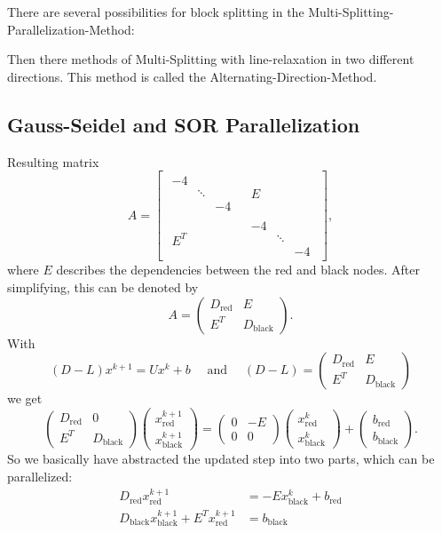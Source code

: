 There are several possibilities for block splitting in the Multi-Splitting-Parallelization-Method:


Then there methods of Multi-Splitting with line-relaxation in two different directions. This method is called the Alternating-Direction-Method.

\subsection*{Gauss-Seidel and SOR Parallelization}
\label{sec:Gauss-Seidel and SOR Parallelization}

Resulting matrix
\[
A = \begin{bmatrix}
\begin{matrix}
-4\\
& \ddots \\
&& -4
\end{matrix}
&
\begin{matrix}
	E
\end{matrix}
\\
\begin{matrix}
	E^{T}
\end{matrix}
&
\begin{matrix}
-4\\
& \ddots \\
&& -4
\end{matrix}
\end{bmatrix}
,\] 
where $E$ describes the dependencies between the red and black nodes.
After simplifying, this can be denoted by
\[
A = \begin{pmatrix}
	D_{\text{red}} & E \\
	E^{T} & D_{\text{black}}
\end{pmatrix}
.\] 
With
\[
	(D-L) x^{k+1} = Ux^{k}+b \quad \text{ and } \quad (D-L) = \begin{pmatrix}
	D_{\text{red}} & E \\
	E^{T} & D_{\text{black}}
	\end{pmatrix}
\] 
we get
\[
\begin{pmatrix}
	D_{\text{red}} & 0 \\
	E^{T} & D_{\text{black}}
\end{pmatrix}
\begin{pmatrix}
x^{k+1}_{\text{red}} \\
x^{k+1}_{\text{black}}
\end{pmatrix}
=
\begin{pmatrix}
	0 & -E \\
	0 & 0
\end{pmatrix}
\begin{pmatrix}
x^{k}_{\text{red}} \\
x^{k}_{\text{black}}
\end{pmatrix}
+
\begin{pmatrix}
b_{\text{red}} \\
b_{\text{black}}
\end{pmatrix}
.\] 
So we basically have abstracted the updated step into two parts, which can be parallelized:
\begin{align*}
	D_{\text{red}}x_{\text{red}}^{k+1} &= -E x_{\text{black}}^{k} + b_{\text{red}} \\
	D_{\text{black}}x_{\text{black}}^{k+1} + E^{T} x_{\text{red}}^{k+1} &= b_{\text{black}}
\end{align*}
